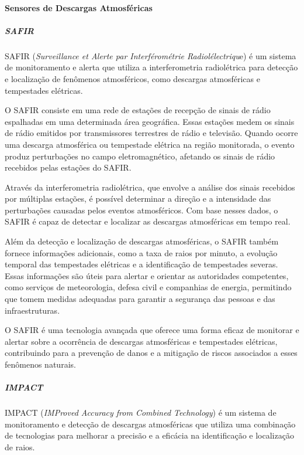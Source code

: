 \documentclass[a4paper, 12pt, onecolumn,singlespacing]{article}
\begin{document}
	\paragraph{Sensores de Descargas Atmosféricas}
	
	\subparagraph{SAFIR}
	
	SAFIR (\textit{Surveillance et Alerte par Interférométrie Radiolélectriqu}e) é um sistema de monitoramento e alerta que utiliza a interferometria radiolétrica para detecção e localização de fenômenos atmosféricos, como descargas atmosféricas e tempestades elétricas.
	
	O SAFIR consiste em uma rede de estações de recepção de sinais de rádio espalhadas em uma determinada área geográfica. Essas estações medem os sinais de rádio emitidos por transmissores terrestres de rádio e televisão. Quando ocorre uma descarga atmosférica ou tempestade elétrica na região monitorada, o evento produz perturbações no campo eletromagnético, afetando os sinais de rádio recebidos pelas estações do SAFIR.
	
	Através da interferometria radiolétrica, que envolve a análise dos sinais recebidos por múltiplas estações, é possível determinar a direção e a intensidade das perturbações causadas pelos eventos atmosféricos. Com base nesses dados, o SAFIR é capaz de detectar e localizar as descargas atmosféricas em tempo real.
	
	Além da detecção e localização de descargas atmosféricas, o SAFIR também fornece informações adicionais, como a taxa de raios por minuto, a evolução temporal das tempestades elétricas e a identificação de tempestades severas. Essas informações são úteis para alertar e orientar as autoridades competentes, como serviços de meteorologia, defesa civil e companhias de energia, permitindo que tomem medidas adequadas para garantir a segurança das pessoas e das infraestruturas.
	
	O SAFIR é uma tecnologia avançada que oferece uma forma eficaz de monitorar e alertar sobre a ocorrência de descargas atmosféricas e tempestades elétricas, contribuindo para a prevenção de danos e a mitigação de riscos associados a esses fenômenos naturais.
	
	\subparagraph{IMPACT}
	
	IMPACT (\textit{IMProved Accuracy from Combined Technology}) é um sistema de monitoramento e detecção de descargas atmosféricas que utiliza uma combinação de tecnologias para melhorar a precisão e a eficácia na identificação e localização de raios.
	
\end{document}
